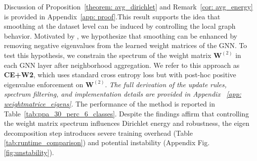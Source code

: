 Discussion of Proposition~\ref{theorem: avg_dirichlet} and Remark~\ref{cor: avg_energy} is provided in Appendix~\ref{app: proof}.This result supports the idea that smoothing at the dataset level can be induced by controlling the local graph behavior. Motivated by \citet{GRAFF}, we hypothesize that smoothing can be enhanced by removing negative eigenvalues from the learned weight matrices of the GNN. To test this hypothesis, we constrain the spectrum of the weight matrix \( \mathbf{W}^{(2)} \) in each GNN layer after neighborhood aggregation.
We refer to this approach as \textbf{CE+W2}, which uses standard cross entropy loss but with post-hoc positive eigenvalue enforcement on \( \mathbf{W}^{(2)} \).
\textit{The full derivation of the update rules, spectrum filtering, and implementation details are provided in Appendix~ \ref{app: weightmatrice_eigens}.} 
The performance of the method is reported in Table~\ref{tab:ppa_30_perc_6_classes}. 
Despite the findings affirm that controlling the weight matrix spectrum influences
Dirichlet energy and robustness, the eigen decomposition step introduces severe training overhead (Table \ref{tab:runtime_comparison}) and potential instability (Appendix Fig. \ref{fig:unstability}).

















